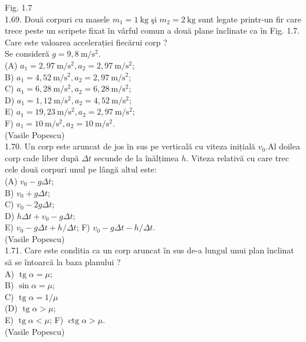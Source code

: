 \documentclass[10pt]{article}
\begin{document}
Fig. 1.7\\
1.69. Două corpuri cu masele $m_{1}=1 \mathrm{~kg}$ şi $m_{2}=2 \mathrm{~kg}$ sunt legate printr-un fir care trece peste un scripete fixat în vârful comun a două plane înclinate ca în Fig. 1.7. Care este valoarea accelerației fiecărui corp ?\\
Se consideră $g=9,8 \mathrm{~m} / \mathrm{s}^{2}$.\\
(A) $a_{1}=2,97 \mathrm{~m} / \mathrm{s}^{2}, a_{2}=2,97 \mathrm{~m} / \mathrm{s}^{2}$;\\
B) $a_{1}=4,52 \mathrm{~m} / \mathrm{s}^{2}, a_{2}=2,97 \mathrm{~m} / \mathrm{s}^{2}$;\\
C) $a_{1}=6,28 \mathrm{~m} / \mathrm{s}^{2}, a_{2}=6,28 \mathrm{~m} / \mathrm{s}^{2}$;\\
D) $a_{1}=1,12 \mathrm{~m} / \mathrm{s}^{2}, a_{2}=4,52 \mathrm{~m} / \mathrm{s}^{2}$;\\
E) $a_{1}=19,23 \mathrm{~m} / \mathrm{s}^{2}, a_{2}=2,97 \mathrm{~m} / \mathrm{s}^{2}$;\\
F) $a_{1}=10 \mathrm{~m} / \mathrm{s}^{2}, a_{2}=10 \mathrm{~m} / \mathrm{s}^{2}$.\\
(Vasile Popescu)\\
1.70. Un corp este aruncat de jos în sus pe verticală cu viteza inițială $v_{0} . \mathrm{Al}$ doilea corp cade liber după $\Delta t$ secunde de la înălțimea $h$. Viteza relativă cu care trec cele două corpuri unul pe lângă altul este:\\
(A) $v_{0}-g \Delta t$;\\
B) $v_{0}+g \Delta t$;\\
C) $v_{0}-2 g \Delta t$;\\
D) $h \Delta t+v_{0}-g \Delta t$;\\
E) $v_{0}-g \Delta t+h / \Delta t$; F) $v_{0}-g \Delta t-h / \Delta t$.\\
(Vasile Popescu)\\
1.71. Care este conditia ca un corp aruncat în sus de-a lungul unui plan înclinat să se întoarcă la baza planului ?\\
A) $\operatorname{tg} \alpha=\mu$;\\
B) $\sin \alpha=\mu$;\\
C) $\operatorname{tg} \alpha=1 / \mu$\\
(D) $\operatorname{tg} \alpha>\mu$;\\
E) $\operatorname{tg} \alpha<\mu$; F) $\operatorname{ctg} \alpha>\mu$.\\
(Vasile Popescu)\\
\end{document}

